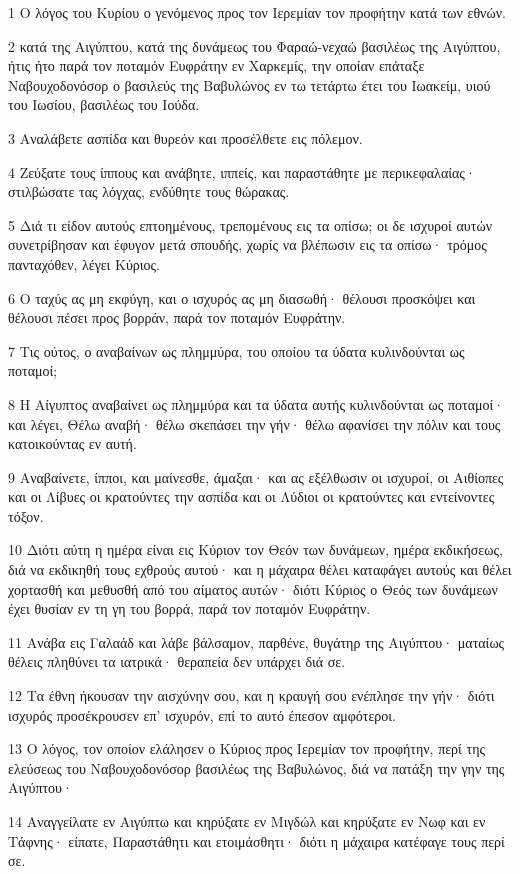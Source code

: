 \par 1 Ο λόγος του Κυρίου ο γενόμενος προς τον Ιερεμίαν τον προφήτην κατά των εθνών.
\par 2 κατά της Αιγύπτου, κατά της δυνάμεως του Φαραώ-νεχαώ βασιλέως της Αιγύπτου, ήτις ήτο παρά τον ποταμόν Ευφράτην εν Χαρκεμίς, την οποίαν επάταξε Ναβουχοδονόσορ ο βασιλεύς της Βαβυλώνος εν τω τετάρτω έτει του Ιωακείμ, υιού του Ιωσίου, βασιλέως του Ιούδα.
\par 3 Αναλάβετε ασπίδα και θυρεόν και προσέλθετε εις πόλεμον.
\par 4 Ζεύξατε τους ίππους και ανάβητε, ιππείς, και παραστάθητε με περικεφαλαίας· στιλβώσατε τας λόγχας, ενδύθητε τους θώρακας.
\par 5 Διά τι είδον αυτούς επτοημένους, τρεπομένους εις τα οπίσω; οι δε ισχυροί αυτών συνετρίβησαν και έφυγον μετά σπουδής, χωρίς να βλέπωσιν εις τα οπίσω· τρόμος πανταχόθεν, λέγει Κύριος.
\par 6 Ο ταχύς ας μη εκφύγη, και ο ισχυρός ας μη διασωθή· θέλουσι προσκόψει και θέλουσι πέσει προς βορράν, παρά τον ποταμόν Ευφράτην.
\par 7 Τις ούτος, ο αναβαίνων ως πλημμύρα, του οποίου τα ύδατα κυλινδούνται ως ποταμοί;
\par 8 Η Αίγυπτος αναβαίνει ως πλημμύρα και τα ύδατα αυτής κυλινδούνται ως ποταμοί· και λέγει, Θέλω αναβή· θέλω σκεπάσει την γήν· θέλω αφανίσει την πόλιν και τους κατοικούντας εν αυτή.
\par 9 Αναβαίνετε, ίπποι, και μαίνεσθε, άμαξαι· και ας εξέλθωσιν οι ισχυροί, οι Αιθίοπες και οι Λίβυες οι κρατούντες την ασπίδα και οι Λύδιοι οι κρατούντες και εντείνοντες τόξον.
\par 10 Διότι αύτη η ημέρα είναι εις Κύριον τον Θεόν των δυνάμεων, ημέρα εκδικήσεως, διά να εκδικηθή τους εχθρούς αυτού· και η μάχαιρα θέλει καταφάγει αυτούς και θέλει χορτασθή και μεθυσθή από του αίματος αυτών· διότι Κύριος ο Θεός των δυνάμεων έχει θυσίαν εν τη γη του βορρά, παρά τον ποταμόν Ευφράτην.
\par 11 Ανάβα εις Γαλαάδ και λάβε βάλσαμον, παρθένε, θυγάτηρ της Αιγύπτου· ματαίως θέλεις πληθύνει τα ιατρικά· θεραπεία δεν υπάρχει διά σε.
\par 12 Τα έθνη ήκουσαν την αισχύνην σου, και η κραυγή σου ενέπλησε την γήν· διότι ισχυρός προσέκρουσεν επ' ισχυρόν, επί το αυτό έπεσον αμφότεροι.
\par 13 Ο λόγος, τον οποίον ελάλησεν ο Κύριος προς Ιερεμίαν τον προφήτην, περί της ελεύσεως του Ναβουχοδονόσορ βασιλέως της Βαβυλώνος, διά να πατάξη την γην της Αιγύπτου·
\par 14 Αναγγείλατε εν Αιγύπτω και κηρύξατε εν Μιγδώλ και κηρύξατε εν Νωφ και εν Τάφνης· είπατε, Παραστάθητι και ετοιμάσθητι· διότι η μάχαιρα κατέφαγε τους περί σε.
